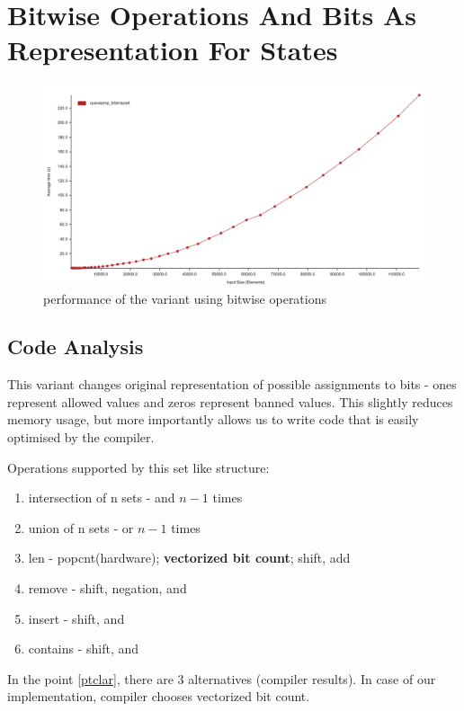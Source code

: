 \documentclass[shortabstract, english, inz]{iithesis}
\begin{document}
\section{Bitwise Operations And Bits As Representation For States}
\label{stack}
\begin{figure}[H]
\centering
\includegraphics[width=1\textwidth, angle=0]{images/queueprop_bitarrayset_performance.png}
\caption{performance of the variant using bitwise operations}
\label{fig:queue_bitarrayset_performance}
\end{figure}
\label{bitwise}
\subsection{Code Analysis}
This variant changes original representation of possible assignments to bits - ones represent allowed values and zeros represent banned values. This slightly reduces memory usage, but more importantly allows us to write code that is easily optimised by the compiler.

\break\break\break
Operations supported by this set like structure:
\begin{enumerate}
    \item intersection of n sets - and \(n - 1\)  times
    \item union of n sets - or \(n - 1\)  times
    \item \label{ptclar}len - popcnt(hardware); \textbf{vectorized bit count}; shift, add
    \item remove - shift, negation, and
    \item insert - shift, and
    \item contains - shift, and
\end{enumerate}
In the point \ref{ptclar}, there are 3 alternatives (compiler results). In case of our implementation, compiler chooses vectorized bit count.
\end{document}

